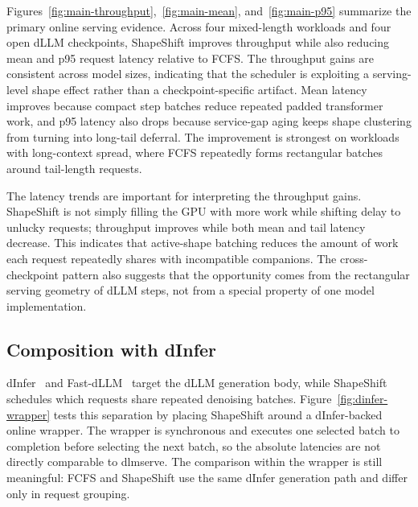 \documentclass[letterpaper]{article} \usepackage[submission]{aaai2027} \usepackage[hyphens]{url} \usepackage{graphicx} \usepackage{subcaption} \urlstyle{rm} \def\UrlFont{\rm} \usepackage{natbib} \usepackage{amsmath} \usepackage{amssymb} \usepackage{booktabs} \usepackage{multirow} \usepackage{algorithm} \usepackage{algorithmic}
\begin{document}
Figures~\ref{fig:main-throughput},~\ref{fig:main-mean}, and~\ref{fig:main-p95} summarize the primary online serving evidence. Across four mixed-length workloads and four open dLLM checkpoints, ShapeShift improves throughput while also reducing mean and p95 request latency relative to FCFS. The throughput gains are consistent across model sizes, indicating that the scheduler is exploiting a serving-level shape effect rather than a checkpoint-specific artifact. Mean latency improves because compact step batches reduce repeated padded transformer work, and p95 latency also drops because service-gap aging keeps shape clustering from turning into long-tail deferral. The improvement is strongest on workloads with long-context spread, where FCFS repeatedly forms rectangular batches around tail-length requests.

The latency trends are important for interpreting the throughput gains. ShapeShift is not simply filling the GPU with more work while shifting delay to unlucky requests; throughput improves while both mean and tail latency decrease. This indicates that active-shape batching reduces the amount of work each request repeatedly shares with incompatible companions. The cross-checkpoint pattern also suggests that the opportunity comes from the rectangular serving geometry of dLLM steps, not from a special property of one model implementation.

\subsection{Composition with dInfer}

dInfer~\cite{dInfer2025} and Fast-dLLM~\cite{zhao2025fastdllm} target the dLLM generation body, while ShapeShift schedules which requests share repeated denoising batches. Figure~\ref{fig:dinfer-wrapper} tests this separation by placing ShapeShift around a dInfer-backed online wrapper. The wrapper is synchronous and executes one selected batch to completion before selecting the next batch, so the absolute latencies are not directly comparable to dlmserve. The comparison within the wrapper is still meaningful: FCFS and ShapeShift use the same dInfer generation path and differ only in request grouping.
\end{document}

